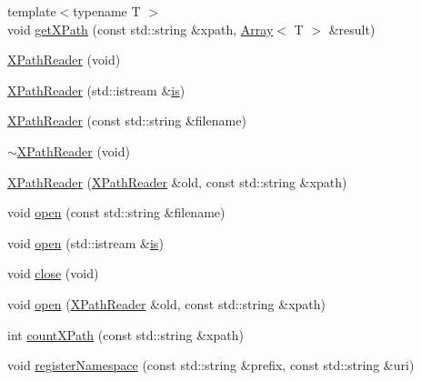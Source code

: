 \begin{DoxyCompactItemize}
\item 
{\footnotesize template$<$typename T $>$ }\\void \mbox{\hyperlink{classXMLXPathReader_1_1XPathReader_a2c16b804ab7842a5bab7a8fe3f433437}{get\+X\+Path}} (const std\+::string \&xpath, \mbox{\hyperlink{classXMLArray_1_1Array}{Array}}$<$ T $>$ \&result)
\item 
\mbox{\hyperlink{classXMLXPathReader_1_1XPathReader_a0f0a3151a7ee18a11d031841dd1aceca}{X\+Path\+Reader}} (void)
\item 
\mbox{\hyperlink{classXMLXPathReader_1_1XPathReader_a3bf8625a1ef55ff3e3f5ffe3afcd27d1}{X\+Path\+Reader}} (std\+::istream \&\mbox{\hyperlink{x_8cc_a81abbbdef81e25584a2eab888e643d3d}{is}})
\item 
\mbox{\hyperlink{classXMLXPathReader_1_1XPathReader_aede8e4b7ed9f4e396b4c6ee1a1e5b846}{X\+Path\+Reader}} (const std\+::string \&filename)
\item 
\mbox{\hyperlink{classXMLXPathReader_1_1XPathReader_aedd43e5673d660cb93b8158166572521}{$\sim$\+X\+Path\+Reader}} (void)
\item 
\mbox{\hyperlink{classXMLXPathReader_1_1XPathReader_ae37728d823bbf1b7f4c09e3f474df32b}{X\+Path\+Reader}} (\mbox{\hyperlink{classXMLXPathReader_1_1XPathReader}{X\+Path\+Reader}} \&old, const std\+::string \&xpath)
\item 
void \mbox{\hyperlink{classXMLXPathReader_1_1XPathReader_aa6e237582bcd20389d60cb29a879890c}{open}} (const std\+::string \&filename)
\item 
void \mbox{\hyperlink{classXMLXPathReader_1_1XPathReader_aa9a57010ee8e71ac43da4388d622fe32}{open}} (std\+::istream \&\mbox{\hyperlink{x_8cc_a81abbbdef81e25584a2eab888e643d3d}{is}})
\item 
void \mbox{\hyperlink{classXMLXPathReader_1_1XPathReader_a2b6cfab8c9771da838a2bca6c9f23cb9}{close}} (void)
\item 
void \mbox{\hyperlink{classXMLXPathReader_1_1XPathReader_a55e38b40f720bb3622e3489561b1457c}{open}} (\mbox{\hyperlink{classXMLXPathReader_1_1XPathReader}{X\+Path\+Reader}} \&old, const std\+::string \&xpath)
\item 
int \mbox{\hyperlink{classXMLXPathReader_1_1XPathReader_a9fd76703ea5321a4666ca9a0c07a222a}{count\+X\+Path}} (const std\+::string \&xpath)
\item 
void \mbox{\hyperlink{classXMLXPathReader_1_1XPathReader_a4df21ae718977be11eb5669002522ebb}{register\+Namespace}} (const std\+::string \&prefix, const std\+::string \&uri)
\item 

\end{DoxyCompactItemize}
